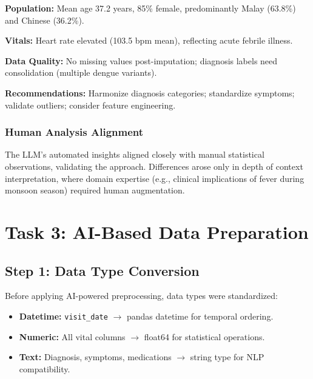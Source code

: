 \documentclass[10pt,a4paper]{article}
\begin{document}
\vspace{0.3cm}

\begin{tcolorbox}[colback=blue!3!white, colframe=blue!40!black, title=\textbf{LLM Dataset Insights}, fonttitle=\bfseries\small, boxrule=0.5pt, arc=2mm, left=3mm, right=3mm, top=2mm, bottom=2mm]
\small
\textbf{Population:} Mean age 37.2 years, 85\% female, predominantly Malay (63.8\%) and Chinese (36.2\%).

\textbf{Vitals:} Heart rate elevated (103.5 bpm mean), reflecting acute febrile illness.

\textbf{Data Quality:} No missing values post-imputation; diagnosis labels need consolidation (multiple dengue variants).

\textbf{Recommendations:} Harmonize diagnosis categories; standardize symptoms; validate outliers; consider feature engineering.
\end{tcolorbox}
\subsubsection{Human Analysis Alignment}

The LLM's automated insights aligned closely with manual statistical observations, validating the approach. Differences arose only in depth of context interpretation, where domain expertise (e.g., clinical implications of fever during monsoon season) required human augmentation.

\section{Task 3: AI-Based Data Preparation}

\subsection{Step 1: Data Type Conversion}

Before applying AI-powered preprocessing, data types were standardized:
\begin{itemize}
    \item \textbf{Datetime:} \texttt{visit\_date} $\to$ pandas datetime for temporal ordering.
    \item \textbf{Numeric:} All vital columns $\to$ float64 for statistical operations.
    \item \textbf{Text:} Diagnosis, symptoms, medications $\to$ string type for NLP compatibility.
\end{itemize}
\end{document}
